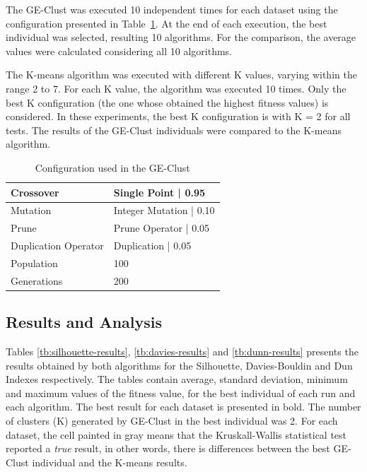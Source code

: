 \documentclass[conference]{IEEEtran}
\begin{document}
	
	The GE-Clust was executed 10 independent times for each dataset using the configuration presented in Table~\ref{ge-configuration}. At the end of each execution, the best individual was selected, resulting 10 algorithms. For the comparison, the average values were calculated considering all 10 algorithms.
	
	
	The K-means algorithm was executed with different K values, varying within the range 2 to 7. For each K value, the algorithm was executed 10 times. Only the best K configuration (the one whose obtained the highest fitness values) is considered. In these experiments, the best K configuration is with K = 2 for all tests. The results of the GE-Clust individuals were compared to the K-means algorithm.
	
	
	\begin{table}[]
		\centering
		\caption{Configuration used in the GE-Clust}
		\label{ge-configuration}
		\begin{tabular}{|l|l|}
			\hline
			{Crossover }           & Single Point  | 0.95     \\ \hline
			{Mutation }            & Integer Mutation   |  0.10 \\ \hline
			{Prune  }              & Prune Operator | 0.05   \\ \hline
			{Duplication Operator } & Duplication   | 0.05     \\ \hline
			{Population}                        & 100                               \\ \hline
			{Generations}                       & 200                               \\ \hline
		\end{tabular}
	\end{table}

	
	\subsection{Results and Analysis}
	
	
	Tables \ref{tb:silhouette-results}, \ref{tb:davies-results} and \ref{tb:dunn-results} presents the results obtained by both algorithms for the Silhouette, Davies-Bouldin and Dun Indexes respectively. The tables contain average, standard deviation, minimum and maximum values of the fitness value, for the best individual of each run and each algorithm. The best result for each dataset is presented in bold. The number of clusters (K) generated by GE-Clust in the best individual was 2. For each dataset, the cell painted in gray means that the Kruskall-Wallis statistical test \cite{mckight2010kruskal} reported a \textit{true} result, in other words, there is differences between the best GE-Clust individual and the K-means results.
		
\end{document}
